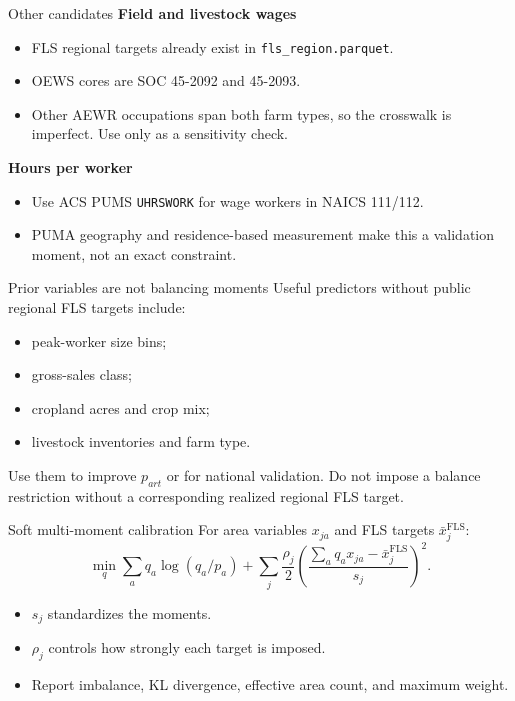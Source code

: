 \documentclass[aspectratio=169,11pt]{beamer}
\newcommand{\FLS}{\mathrm{FLS}}
\begin{document}
\begin{frame}{Other candidates}
  \textbf{Field and livestock wages}
  \begin{itemize}
    \item FLS regional targets already exist in \texttt{fls\_region.parquet}.
    \item OEWS cores are SOC 45-2092 and 45-2093.
    \item Other AEWR occupations span both farm types, so the crosswalk is
      imperfect. Use only as a sensitivity check.
  \end{itemize}

  \textbf{Hours per worker}
  \begin{itemize}
    \item Use ACS PUMS \texttt{UHRSWORK} for wage workers in NAICS 111/112.
    \item PUMA geography and residence-based measurement make this a validation
      moment, not an exact constraint.
  \end{itemize}
\end{frame}

\begin{frame}{Prior variables are not balancing moments}
  Useful predictors without public regional FLS targets include:

  \begin{itemize}
    \item peak-worker size bins;
    \item gross-sales class;
    \item cropland acres and crop mix;
    \item livestock inventories and farm type.
  \end{itemize}

  Use them to improve $p_{art}$ or for national validation. Do not impose a
  balance restriction without a corresponding realized regional FLS target.
\end{frame}

\begin{frame}{Soft multi-moment calibration}
  For area variables $x_{ja}$ and FLS targets $\bar x_j^{\FLS}$:
  \[
    \min_q
      \sum_a q_a\log(q_a/p_a)
      +\sum_j\frac{\rho_j}{2}
      \left(
        \frac{\sum_aq_ax_{ja}-\bar x_j^{\FLS}}{s_j}
      \right)^2.
  \]

  \begin{itemize}
    \item $s_j$ standardizes the moments.
    \item $\rho_j$ controls how strongly each target is imposed.
    \item Report imbalance, KL divergence, effective area count, and maximum
      weight.
  \end{itemize}
\end{frame}
\end{document}
